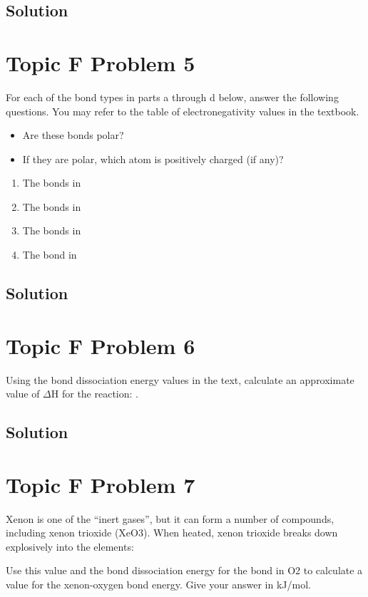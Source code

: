 \documentclass[10pt]{article}
\begin{document}
        \subsection{Solution}


    \pagebreak
    \section{Topic F Problem 5}
        For each of the bond types in parts a through d below, answer the following questions. 
        You may refer to the table of electronegativity values in the textbook.
        \begin{itemize}
            \item   Are these bonds polar?
            \item   If they are polar, which atom is positively charged (if any)?
        \end{itemize}
        \begin{multicols}{2}
            \begin{enumerate}[label=\alph*)]
                \item   The  bonds in 
                \item   The  bonds in 
                \item   The  bonds in  
                \item   The  bond in 
            \end{enumerate}
        \end{multicols}
        
        \subsection{Solution}


    \pagebreak
    \section{Topic F Problem 6}
        Using the bond dissociation energy values in the text, calculate an approximate value of $\Delta$H for the reaction: .
        
        \subsection{Solution}


    \pagebreak
    \section{Topic F Problem 7}
        Xenon is one of the “inert gases”, but it can form a number of compounds, including xenon trioxide (XeO3). 
        When heated, xenon trioxide breaks down explosively into the elements:
        \begin{center}
        \end{center}
        Use this value and the bond dissociation energy for the bond in O2 to calculate a value for the xenon-oxygen bond energy. Give your answer in kJ/mol.
        
\end{document}
